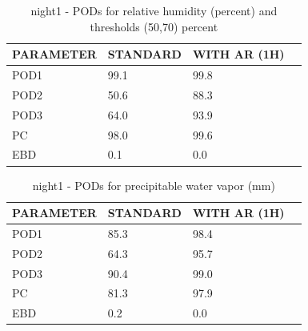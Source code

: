 \begin{table}[p!]
\begin{center}
\begin{tabular}{|l|l|l|l|}
\hline
\multicolumn{1}{|c|}{\cellcolor[HTML]{C0C0C0}\textbf{PARAMETER}} & \multicolumn{1}{c|}{\cellcolor[HTML]{C0C0C0}\textbf{STANDARD}} & \multicolumn{1}{c|}{\cellcolor[HTML]{C0C0C0}\textbf{WITH AR (1H)}} \\
\hline
\cellcolor[HTML]{C0C0C0}POD1  & 99.1                                & 99.8         \\
\cellcolor[HTML]{C0C0C0}POD2  & 50.6                                & 88.3         \\
\cellcolor[HTML]{C0C0C0}POD3  & 64.0                                & 93.9         \\
\cellcolor[HTML]{C0C0C0}PC    & 98.0                                & 99.6           \\
\cellcolor[HTML]{C0C0C0}EBD   & 0.1                                & 0.0          \\
\hline
\end{tabular}
\caption{night1 - PODs for relative humidity (percent) and thresholds (50,70) percent}
\label{tab:podrhFT:night1}
\end{center}
\end{table}
\begin{table}[p!]
\begin{center}
\begin{tabular}{|l|l|l|l|}
\hline
\multicolumn{1}{|c|}{\cellcolor[HTML]{C0C0C0}\textbf{PARAMETER}} & \multicolumn{1}{c|}{\cellcolor[HTML]{C0C0C0}\textbf{STANDARD}} & \multicolumn{1}{c|}{\cellcolor[HTML]{C0C0C0}\textbf{WITH AR (1H)}} \\
\hline
\cellcolor[HTML]{C0C0C0}POD1  & 85.3                                & 98.4         \\
\cellcolor[HTML]{C0C0C0}POD2  & 64.3                                & 95.7         \\
\cellcolor[HTML]{C0C0C0}POD3  & 90.4                                & 99.0         \\
\cellcolor[HTML]{C0C0C0}PC    & 81.3                                  & 97.9           \\
\cellcolor[HTML]{C0C0C0}EBD   & 0.2                                 & 0.0          \\
\hline
\end{tabular}
\caption{night1 - PODs for precipitable water vapor (mm)}
\label{tab:podpwv:night1}
\end{center}
\end{table}
